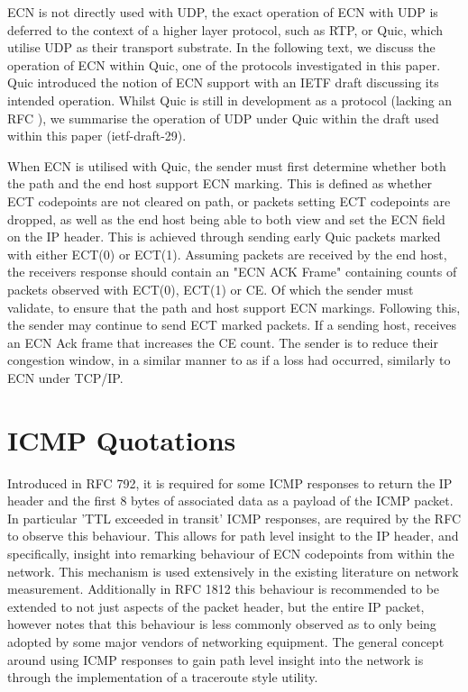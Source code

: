 \documentclass{l4proj}
\begin{document}
ECN is not directly used with UDP, the exact operation of ECN with UDP is deferred to the context of a higher layer protocol, such as RTP, or Quic, which utilise UDP as their transport substrate. In the following text, we discuss the operation of ECN within Quic, one of the protocols investigated in this paper. Quic introduced the notion of ECN support with an IETF draft \cite{johansson_ecn_2017} discussing its intended operation. Whilst Quic is still in development as a protocol (lacking an RFC ), we summarise the operation of UDP under Quic within the draft used within this paper (ietf-draft-29).

When ECN is utilised with Quic, the sender must first determine whether both the path and the end host support ECN marking. This is defined as whether ECT codepoints are not cleared on path, or packets setting ECT codepoints are dropped, as well as the end host being able to both view and set the ECN field on the IP header. This is achieved through sending early Quic packets marked with either ECT(0) or ECT(1). Assuming packets are received by the end host, the receivers response should contain an "ECN ACK Frame" containing counts of packets observed with ECT(0), ECT(1) or CE. Of which the sender must validate, to ensure that the path and host support ECN markings. Following this, the sender may continue to send ECT marked packets. If a sending host, receives an ECN Ack frame that increases the CE count. The sender is to reduce their congestion window, in a similar manner to as if a loss had occurred, similarly to ECN under TCP/IP.

\section{ICMP Quotations}
\label{sec:icmp}

Introduced in RFC 792, it is required for some ICMP responses to return the IP header and the first 8 bytes of associated data as a payload of the ICMP packet. In particular 'TTL exceeded in transit' ICMP responses, are required by the RFC to observe this behaviour. This allows for path level insight to the IP header, and specifically, insight into remarking behaviour of ECN codepoints from within the network. This mechanism is used extensively in the existing literature on network measurement. Additionally in RFC 1812 this behaviour is recommended to be extended to not just aspects of the packet header, but the entire IP packet, however \cite{noauthor_tracebox_nodate} notes that this behaviour is less commonly observed as to only being adopted by some major vendors of networking equipment. The general concept around using ICMP responses to gain path level insight into the network is through the implementation of a traceroute style utility. 
\end{document}
